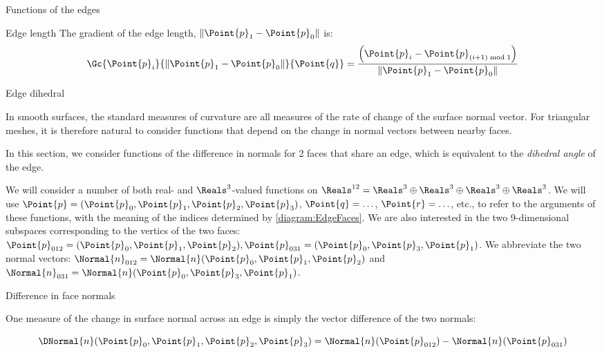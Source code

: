\begin{plSection}{Functions of the edges}
\begin{plSection}{Edge length}
The gradient of the edge length, $\|\Point{p}_1 - \Point{p}_0\|$ is:
\begin{equation}
\Gc{\Point{p}_i}{\| \Point{p}_1 - \Point{p}_0 \|}{\Point{q}} =
\frac{\left( \Point{p}_i - \Point{p}_{(i+1) \bmod 1} \right)}
{\|\Point{p}_1 - \Point{p}_0\|}
\end{equation}

\end{plSection}%

\begin{plSection}{Edge dihedral}
\label{sec:edge_dihedral}

In smooth surfaces,
the standard measures of curvature are all measures
of the rate of change of the surface normal vector.
For triangular meshes, it is therefore natural to
consider functions that depend on the change in
normal vectors between nearby faces.

In this section, we consider functions of the difference
in normals for 2 faces that share an edge,
which is equivalent to the {\it dihedral angle} of the edge.

We will consider a number of both real- and $\Reals^3$-valued functions on
$\Reals^{12} = \Reals^3 \oplus \Reals^3 \oplus \Reals^3 \oplus \Reals^3$.
We will use 
$\Point{p} = (\Point{p}_0, \Point{p}_1, \Point{p}_2, \Point{p}_3)$, 
$\Point{q}=\ldots$, $\Point{r}=\ldots$, etc.,
to refer to the arguments of these functions, with the meaning
of the indices determined by \cref{diagram:EdgeFaces}.
We are also interested in the two 9-dimensional subspaces
corresponding to the vertics of the two faces:
$\Point{p}_{012} = 
(\Point{p}_0,\Point{p}_1,\Point{p}_2), \Point{p}_{031} = 
(\Point{p}_0,\Point{p}_3,\Point{p}_1)$.
We abbreviate the two normal vectors:
$\Normal{n}_{012} = \Normal{n}(\Point{p}_0,\Point{p}_1,\Point{p}_2)$
and
$\Normal{n}_{031} = \Normal{n}(\Point{p}_0,\Point{p}_3,\Point{p}_1)$.

\end{plSection}%

\begin{plSection}{Difference in face normals}
\label{sec:normal_difference}

One measure of the change in surface normal across an edge
is simply the vector difference of the two normals:

\begin{equation}
\label{eq:deltan}
\DNormal{n} (\Point{p}_0, \Point{p}_1, \Point{p}_2, \Point{p}_3)
=
\Normal{n} (\Point{p}_{012}) - \Normal{n} (\Point{p}_{031})
\end{equation}


\end{plSection}
\end{plSection}
